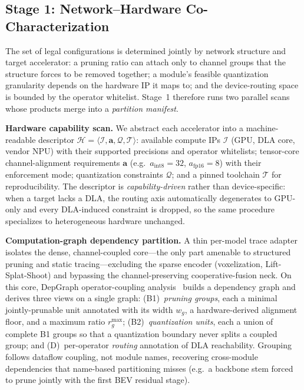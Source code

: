 \documentclass[letterpaper]{article} %
\begin{document}
\subsection{Stage 1: Network--Hardware Co-Characterization}

The set of legal configurations is determined jointly by network
structure and target accelerator: a pruning ratio can attach only to
channel groups that the structure forces to be removed together; a
module's feasible quantization granularity depends on the hardware IP it
maps to; and the device-routing space is bounded by the operator
whitelist. Stage~1 therefore runs two parallel scans whose products merge
into a \emph{partition manifest}.

\noindent\textbf{Hardware capability scan.}
We abstract each accelerator into a machine-readable descriptor
$\mathcal{H}=\langle\mathcal{I},\mathbf{a},\mathcal{Q},\mathcal{T}\rangle$:
available compute IPs $\mathcal{I}$ (GPU, DLA core, vendor NPU) with their
supported precisions and operator whitelists; tensor-core channel-alignment
requirements $\mathbf{a}$ (e.g.\ $a_{\mathrm{int8}}{=}32$,
$a_{\mathrm{fp16}}{=}8$) with their enforcement mode; quantization
constraints $\mathcal{Q}$; and a pinned toolchain $\mathcal{T}$ for
reproducibility. The descriptor is \emph{capability-driven} rather than
device-specific: when a target lacks a DLA, the routing axis automatically
degenerates to GPU-only and every DLA-induced constraint is dropped, so the
same procedure specializes to heterogeneous hardware unchanged.

\noindent\textbf{Computation-graph dependency partition.}
A thin per-model trace adapter isolates the dense, channel-coupled
core---the only part amenable to structured pruning and static
tracing---excluding the sparse encoder (voxelization, Lift-Splat-Shoot)
and bypassing the channel-preserving cooperative-fusion neck. On this core,
DepGraph operator-coupling analysis~\cite{fang2023depgraph} builds a
dependency graph and derives three views on a single graph:
(B1)~\emph{pruning groups}, each a minimal jointly-prunable unit annotated
with its width $w_g$, a hardware-derived alignment floor, and a maximum
ratio $r^{\max}_g$; (B2)~\emph{quantization units}, each a union of complete
B1 groups so that a quantization boundary never splits a coupled group; and
(D)~per-operator \emph{routing} annotation of DLA reachability. Grouping
follows dataflow coupling, not module names, recovering cross-module
dependencies that name-based partitioning misses (e.g.\ a backbone stem
forced to prune jointly with the first BEV residual stage).
\end{document}

